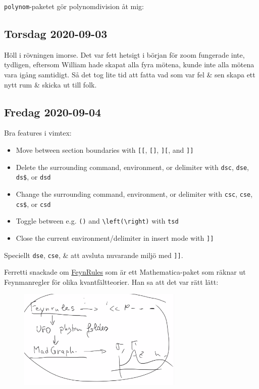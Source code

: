 \bigskip

\verb|polynom|-paketet gör polynomdivision åt mig:
\begin{center}
\end{center}


\subsection{Torsdag 2020-09-03}

Höll i rövningen imorse. Det var fett hetsigt i början för zoom fungerade inte, tydligen, eftersom William hade skapat alla fyra mötena, kunde inte alla mötena vara igång samtidigt. Så det tog lite tid att fatta vad som var fel \& sen skapa ett nytt rum \& skicka ut till folk.

\subsection{Fredag 2020-09-04}


Bra features i vimtex:
\begin{itemize}
    \item Move between section boundaries with \verb|[[|, \verb|[]|, \verb|][|, and \verb|]]|
    \item Delete the surrounding command, environment, or delimiter with \verb|dsc|, \verb|dse|, \verb|ds$|, or \verb|dsd|
    \item Change the surrounding command, environment, or delimiter with \verb|csc|, \verb|cse|, \verb|cs$|, or \verb|csd|
    \item Toggle between e.g. \verb|()| and \verb|\left(\right)| with \verb|tsd|
    \item Close the current environment/delimiter in insert mode with \verb|]]|
\end{itemize}
Speciellt \verb|dse|, \verb|cse|, \& att avsluta nuvarande miljö med \verb|]]|.



\bigskip

Ferretti snackade om \href{http://feynrules.irmp.ucl.ac.be/}{\color{blue}FeynRules} som är ett Mathematica-paket som räknar ut Feynmanregler för olika kvantfältteorier. Han sa att det var rätt lätt:
\begin{figure}[H]
    \centering
    \includegraphics[width=0.7\textwidth]{pics/ferretti_on_FeynRules.png}
\end{figure}

